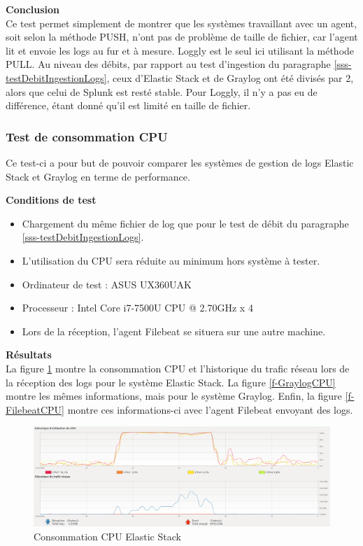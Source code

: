 \documentclass[paper=a4, fontsize=11pt]{scrartcl}
\begin{document}
\textbf{Conclusion} \\
Ce test permet simplement de montrer que les systèmes travaillant avec un agent, soit selon la méthode PUSH, n'ont pas de problème de taille de fichier, car l'agent lit et envoie les logs au fur et à mesure. Loggly est le seul ici utilisant la méthode PULL. Au niveau des débits, par rapport au test d'ingestion du paragraphe \ref{sss-testDebitIngestionLogs}, ceux d'Elastic Stack et de Graylog ont été divisés par 2, alors que celui de Splunk est resté stable. Pour Loggly, il n'y a pas eu de différence, étant donné qu'il est limité en taille de fichier.


\subsubsection{Test de consommation CPU}

Ce test-ci a pour but de pouvoir comparer les systèmes de gestion de logs Elastic Stack et Graylog en terme de performance.

\textbf{Conditions de test} \\
\begin{itemize}
    \item Chargement du même fichier de log que pour le test de débit du paragraphe \ref{sss-testDebitIngestionLogs}.
    \item L'utilisation du CPU sera réduite au minimum hors système à tester.
    \item Ordinateur de test : ASUS UX360UAK
    \item Processeur : Intel Core i7-7500U CPU @ 2.70GHz x 4
    \item Lors de la réception, l'agent Filebeat se situera sur une autre machine.
\end{itemize}

\textbf{Résultats} \\
La figure \ref{f-ElasticCPU} montre la consommation CPU et l'historique du trafic réseau lors de la réception des logs pour le système Elastic Stack. La figure \ref{f-GraylogCPU} montre les mêmes informations, mais pour le système Graylog. Enfin, la figure \ref{f-FilebeatCPU} montre ces informations-ci avec l'agent Filebeat envoyant des logs.

\begin{figure}[H]
    \centering
    \includegraphics[width=18cm]{img/screenshots/Elastic_CPU_MEM_Receive_modified.png}
    \caption{Consommation CPU Elastic Stack}
    \label{f-ElasticCPU}
\end{figure}
\end{document}
